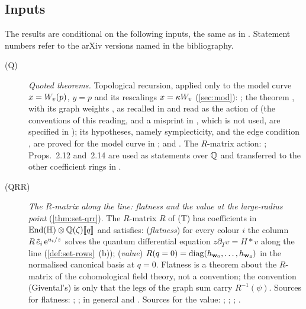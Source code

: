 
\subsection{Inputs}
\label{sec:int-inputs}

The results are conditional on the following inputs, the same as in . Statement numbers refer to the arXiv versions named in the bibliography.
\begin{description}
\item[(Q)] \emph{Quoted theorems.} Topological recursion, applied only to the model curve $x=W_{v}(p)$, $y=p$ and its rescalings $x=\kappa W_{v}$ (\cref{sec:mod}): \cite[Def.~4.2, (4-9), with the kernel (4-3); Theorems~4.2 and~4.6; Theorem~5.1, (5-14), with \S5.3, (5-27)--(5-30)]{Eynard:2007kz}; the theorem \cite[Theorem~4.1, with (4-1)--(4-3)]{DuninBarkowski:2012bw}, with its graph weights \cite[\S2.3, (2-22)--(2-26)]{DuninBarkowski:2012bw}, as recalled in \cite[\S2.6, (2-30)--(2-32), (2-34), (2-35)]{Dunin-Barkowski:2015caa} and read as the action of \cite[Defs.~2.2, 2.13]{PPZ15} (the conventions of this reading, and a misprint in \cite[(2-33)]{Dunin-Barkowski:2015caa}, which is not used, are specified in ); its hypotheses, namely symplecticity, \cite[(2-32)]{Dunin-Barkowski:2015caa} and the edge condition \cite[(4-1)]{DuninBarkowski:2012bw}, are proved for the model curve in ; and \cite[Theorem~7.1: (7.6), (7.7) with its factor $1/\hbar^2$, (7.9), (7.10), with the kernel (1.1) and the assumptions of \S1.1]{ABDKS25}. The $R$-matrix action: \cite[\S0.2, (1); Def.~0.3, in particular (iii); (5); Remark~2.1 and (6); Def.~2.2, with the convention stated after it (p.~20); Def.~2.5, with the convention stated after it; Prop.~2.12, with the formula (8) in its proof; Def.~2.13; Prop.~2.14]{PPZ15}; Props.~2.12 and~2.14 are used as statements over $\mathbb{Q}$ and transferred to the other coefficient rings in .
\item[(QRR)] \emph{The $R$-matrix along the line: flatness and the value at the large-radius point} (\cref{thm:set-qrr}). The $R$-matrix $R$ of (T) has coefficients in $\operatorname{End}(\mathbb{H})\otimes\mathbb{Q}(\zeta)[\![ q ]\!]$ and satisfies: (\emph{flatness}) for every colour $i$ the column $R\,\tilde e_i\,\mathrm{e}^{u_i/z}$ solves the quantum differential equation $z\partial_Tv=H*v$ along the line (\cref{def:set-rows}~(b)); (\emph{value}) $R(q=0)=\operatorname{diag}(h_{\mathbf{w}_0},\dots,h_{\mathbf{w}_4})$ in the normalised canonical basis at $q=0$. Flatness is a theorem about the $R$-matrix of the cohomological field theory, not a convention; the convention (Givental's) is only that the legs of the graph sum carry $R^{-1}(\psi)$. Sources for flatness: \cite[Lemma~5.2, (16)]{GJR18}; \cite[\S4.2, (12)--(13)]{GJR17}; in general \cite[Section~1, Proposition (a)--(c)]{Giv01} and \cite[Props.~7.7, 8.2~(ii), 8.4, 8.7~(ii)]{MR2917177}. Sources for the value: \cite[(17), in the proof of Lemma~5.2]{GJR18}; \cite[(19)--(20), in the proof of Lemma~4.6, at $t=0$]{GJR17}; \cite[\S2.2, Theorem~1 and the Remark after it]{Giv01}; \cite[Theorem~1, Corollary~1]{MR2276766}.

\end{description}
